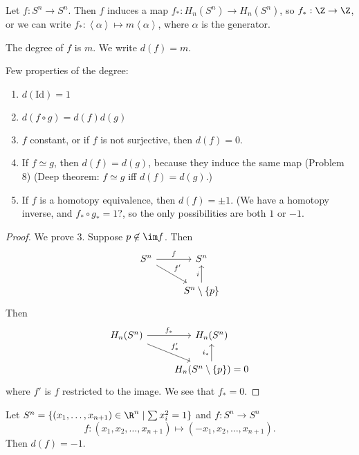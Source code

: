 Let $f: S^{n} \to  S^{n}$.
Then $f$ induces a map $f_*: H_n(S^{n}) \to  H_n(S^{n})$, so $f_*: \Z \to  \Z$,
or we can write $f_*: \left< \alpha\right> \mapsto m \left<\alpha \right>$, where $\alpha$ is the generator.
\begin{definition}
    The degree of $f$ is $m$. 
    We write $d(f) = m$.
\end{definition}
\begin{prop} Few properties of the degree:
    \begin{enumerate}
        \item $d(\text{Id}) = 1$
        \item  $d(f  \circ  g) = d(f) d(g)$ 
        \item  $f$ constant, or if $f$ is not surjective, then $d(f) = 0$.
        \item If $f \simeq g$, then $d(f) = d(g)$, because they induce the same map (Problem 8)
            (Deep theorem:  $f \simeq g$ iff $d(f) = d(g)$.)
        \item If $f$ is a homotopy equivalence, then $d(f) = \pm 1$.
            (We have a homotopy inverse, and  $f_*  \circ  g_* = 1$?, so the only possibilities are both $1$ or $-1$.
    \end{enumerate}
\end{prop}
\begin{proof}
    We prove 3.
    Suppose $p \not\in  \im f$.
    Then
    \[
        \begin{tikzcd}
            S^{n} \arrow[dr, "f'"] \arrow[r, "f"] & S^{n}\\
                                                 & S^{n} \setminus \{p\}  \arrow[u, "i"]
        \end{tikzcd}
    \]
    Then
    \[
        \begin{tikzcd}
            H_n(S^{n}) \arrow[dr, "f'_*"] \arrow[r, "f_*"] & H_n(S^{n})\\
                                                           & H_n(S^{n} \setminus \{p\}) = 0  \arrow[u, "i_*"]
        \end{tikzcd}
    \]
    where $f'$ is $f$ restricted to the image.
    We see that $f_* = 0$.
\end{proof}



\begin{theorem}
    Let $S^{n} = \{(x_1, \ldots, x_{n+1})\in \R^n  \mid  \sum x_i^2 = 1\}$ and $f: S^{n} \to  S^{n}$ 
    \[
        f: (x_1, x_2, \ldots, x_{n+1}) \mapsto 
        (-x_1, x_2, \ldots, x_{n+1})
    .\] 
    Then $d(f) = -1$.
\end{theorem}

